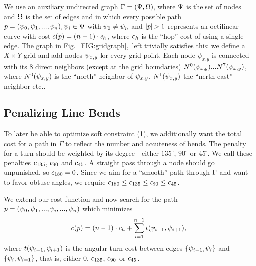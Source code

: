\documentclass{sig-alternate-sigmod09}
\begin{document}
We use an auxiliary undirected graph $\Gamma = (\Psi, \Omega)$, where $\Psi$ is the set of nodes and $\Omega$ is the set of edges and in which every possible path $p = (\psi_0, \psi_1, ..., \psi_n), \psi_i \in \Psi$ with $\psi_0 \neq \psi_n$ and $|p| > 1$ represents an octilinear curve with cost $c(p) = (n - 1) \cdot c_h$, where $c_h$ is the ``hop'' cost of using a single edge.
The graph in Fig.~\ref{FIG:gridgraph},~left trivially satisfies this: we define a $X\times Y$ grid and add nodes $\psi_{x, y}$ for every grid point.
Each node $\psi_{x,y}$ is connected with its 8 direct neighbors (except at the grid boundaries) $N^0(\psi_{x, y}) ... N^7(\psi_{x, y})$, where $N^0(\psi_{x, y})$ is the ``north'' neighbor of $\psi_{x, y}$, $N^1(\psi_{x, y})$ the ``north-east'' neighbor etc..

\subsection{Penalizing Line Bends}

To later be able to optimize soft constraint (1), we additionally want the total cost for a path in $\Gamma$ to reflect the number and accuteness of bends.
The penalty for a turn should be weighted by its degree - either $135^{\circ}$, $90^{\circ}$ or $45^{\circ}$.
We call these penalties $c_{135}$, $c_{90}$ and $c_{45}$.
A straight pass through a node should go unpunished, so $c_{180} = 0$.
Since we aim for a ``smooth'' path through $\Gamma$ and want to favor obtuse angles, we require $c_{180} \leq c_{135} \leq c_{90} \leq c_{45}$.

We extend our cost function and now search for the path $p = (\psi_0, \psi_1, ..., \psi_i, ..., \psi_n)$ which minimizes
\begin{align}
	c(p) = (n - 1) \cdot c_h + \sum_{i=1}^{n - 1} t(\psi_{i-1}, \psi_{i+1}),
\end{align}
where $t(\psi_{i-1}, \psi_{i+1})$ is the angular turn cost between edges $\{\psi_{i-1}, \psi_{i}\}$ and $\{\psi_{i}, \psi_{i=1}\}$, that is, either 0, $c_{135}$, $c_{90}$ or $c_{45}$.
\end{document}
